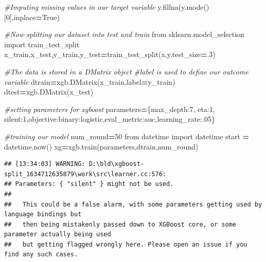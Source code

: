 \documentclass[
]{book}
\newenvironment{Shaded}{\begin{snugshade}}{\end{snugshade}}
\newcommand{\CommentTok}[1]{\textcolor[rgb]{0.56,0.35,0.01}{\textit{#1}}}
\newcommand{\DecValTok}[1]{\textcolor[rgb]{0.00,0.00,0.81}{#1}}
\newcommand{\FloatTok}[1]{\textcolor[rgb]{0.00,0.00,0.81}{#1}}
\newcommand{\ImportTok}[1]{#1}
\newcommand{\NormalTok}[1]{#1}
\newcommand{\OperatorTok}[1]{\textcolor[rgb]{0.81,0.36,0.00}{\textbf{#1}}}
\newcommand{\StringTok}[1]{\textcolor[rgb]{0.31,0.60,0.02}{#1}}
\newcommand{\VariableTok}[1]{\textcolor[rgb]{0.00,0.00,0.00}{#1}}
\begin{document}
\begin{Shaded}
\begin{Highlighting}[]
 

\CommentTok{\#Imputing missing values in our target variable }
\NormalTok{y.fillna(y.mode()[}\DecValTok{0}\NormalTok{],inplace}\OperatorTok{=}\VariableTok{True}\NormalTok{) }

\CommentTok{\#Now splitting our dataset into test and train }
\ImportTok{from}\NormalTok{ sklearn.model\_selection }\ImportTok{import}\NormalTok{ train\_test\_split }
\NormalTok{x\_train,x\_test,y\_train,y\_test}\OperatorTok{=}\NormalTok{train\_test\_split(x,y,test\_size}\OperatorTok{=}\FloatTok{.3}\NormalTok{)}

\CommentTok{\#The data is stored in a DMatrix object }
\CommentTok{\#label is used to define our outcome variable}
\NormalTok{dtrain}\OperatorTok{=}\NormalTok{xgb.DMatrix(x\_train,label}\OperatorTok{=}\NormalTok{y\_train)}
\NormalTok{dtest}\OperatorTok{=}\NormalTok{xgb.DMatrix(x\_test)}

\CommentTok{\#setting parameters for xgboost}
\NormalTok{parameters}\OperatorTok{=}\NormalTok{\{}\StringTok{\textquotesingle{}max\_depth\textquotesingle{}}\NormalTok{:}\DecValTok{7}\NormalTok{, }\StringTok{\textquotesingle{}eta\textquotesingle{}}\NormalTok{:}\DecValTok{1}\NormalTok{, }\StringTok{\textquotesingle{}silent\textquotesingle{}}\NormalTok{:}\DecValTok{1}\NormalTok{,}\StringTok{\textquotesingle{}objective\textquotesingle{}}\NormalTok{:}\StringTok{\textquotesingle{}binary:logistic\textquotesingle{}}\NormalTok{,}\StringTok{\textquotesingle{}eval\_metric\textquotesingle{}}\NormalTok{:}\StringTok{\textquotesingle{}auc\textquotesingle{}}\NormalTok{,}\StringTok{\textquotesingle{}learning\_rate\textquotesingle{}}\NormalTok{:}\FloatTok{.05}\NormalTok{\}}

\CommentTok{\#training our model }
\NormalTok{num\_round}\OperatorTok{=}\DecValTok{50}
\ImportTok{from}\NormalTok{ datetime }\ImportTok{import}\NormalTok{ datetime }
\NormalTok{start }\OperatorTok{=}\NormalTok{ datetime.now() }
\NormalTok{xg}\OperatorTok{=}\NormalTok{xgb.train(parameters,dtrain,num\_round) }
\end{Highlighting}
\end{Shaded}

\begin{verbatim}
## [13:34:03] WARNING: D:\bld\xgboost-split_1634712635879\work\src\learner.cc:576: 
## Parameters: { "silent" } might not be used.
## 
##   This could be a false alarm, with some parameters getting used by language bindings but
##   then being mistakenly passed down to XGBoost core, or some parameter actually being used
##   but getting flagged wrongly here. Please open an issue if you find any such cases.
\end{verbatim}
\end{document}
